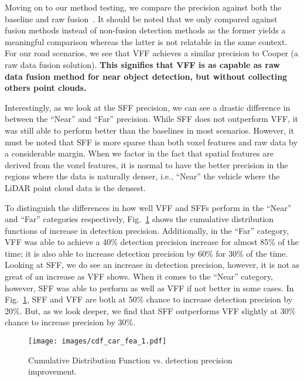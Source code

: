 \documentclass[sigconf]{acmart}
\begin{document}
Moving on to our method testing, we compare the precision against both the baseline and raw fusion~\cite{qi2019cooper}. It should be noted that we only compared against fusion methods instead of non-fusion detection methods as the former yields a meaningful comparison whereas the latter is not relatable in the same context. For our road scenarios, we see that VFF achieves a similar precision to Cooper (a raw data fusion solution). 
\textbf{
This signifies that VFF is as capable as raw data fusion method for near object detection, but without collecting others point clouds.}




Interestingly, as we look at the SFF precision, we can see a drastic difference in between the ``Near'' and ``Far'' precision. While SFF does not outperform VFF, it was still able to perform better than the baselines in most scenarios. However, it must be noted that SFF is more sparse than both voxel features and raw data by a considerable margin. When we factor in the fact that spatial features are derived from the voxel features, it is normal to have the better precision in the regions where the data is naturally denser, i.e., ``Near'' the vehicle where the LiDAR point cloud data is the densest. 











To distinguish the differences in how well VFF and SFFs perform in the ``Near'' and ``Far'' categories respectively, Fig.~\ref{figure:cdf} shows the cumulative distribution functions of increase in detection precision.  
Additionally, in the ``Far'' category, VFF was able to achieve a 40\% detection precision increase for almost 85\% of the time; it is also able to increase detection precision by 60\% for 30\% of the time. Looking at SFF, we do see an increase in detection precision, however, it is not as great of an increase as VFF shows.
When it comes to the ``Near'' category, however, SFF was able to perform as well as VFF if not better in some cases. In Fig.~\ref{figure:cdf}, SFF and VFF are both at 50\% chance to increase detection precision by 20\%. But, as we look deeper, we find that SFF outperforms VFF slightly at 30\% chance to increase precision by 30\%.


\begin{figure}[!h]
\centering
\texttt{[image: images/cdf\_car\_fea\_1.pdf]}
\vspace{-5pt}
\caption{Cumulative Distribution Function vs. detection precision improvement.}
\vspace{-8pt}
\label{figure:cdf}
\end{figure}
\end{document}
